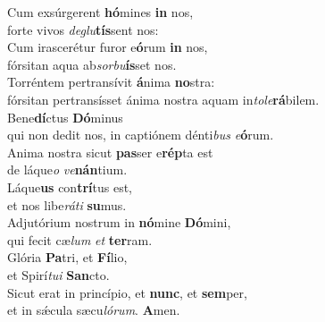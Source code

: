 \evenverse Cum exsúrgerent \textbf{hó}mines \textbf{in} nos,~\*\\
\evenverse forte vivos \textit{de}\textit{glu}\textbf{tís}sent nos:\\
\oddverse Cum irascerétur furor e\textbf{ó}rum \textbf{in} nos,~\*\\
\oddverse fórsitan aqua ab\textit{sor}\textit{bu}\textbf{ís}set nos.\\
\evenverse Torréntem pertransívit \textbf{á}nima \textbf{no}stra:~\*\\
\evenverse fórsitan pertransísset ánima nostra aquam in\textit{to}\textit{le}\textbf{rá}bilem.\\
\oddverse Bene\textbf{dí}ctus \textbf{Dó}minus~\*\\
\oddverse qui non dedit nos, in captiónem dénti\textit{bus} \textit{e}\textbf{ó}rum.\\
\evenverse Anima nostra sicut \textbf{pas}ser e\textbf{rép}ta est~\*\\
\evenverse de láque\textit{o} \textit{ve}\textbf{nán}tium.\\
\oddverse Láque\textbf{us} con\textbf{trí}tus est,~\*\\
\oddverse et nos libe\textit{rá}\textit{ti} \textbf{su}mus.\\
\evenverse Adjutórium nostrum in \textbf{nó}mine \textbf{Dó}mini,~\*\\
\evenverse qui fecit cæ\textit{lum} \textit{et} \textbf{ter}ram.\\
\oddverse Glória \textbf{Pa}tri, et \textbf{Fí}lio,~\*\\
\oddverse et Spirí\textit{tu}\textit{i} \textbf{San}cto.\\
\evenverse Sicut erat in princípio, et \textbf{nunc}, et \textbf{sem}per,~\*\\
\evenverse et in sǽcula sæcu\textit{ló}\textit{rum}. \textbf{A}men.\\
